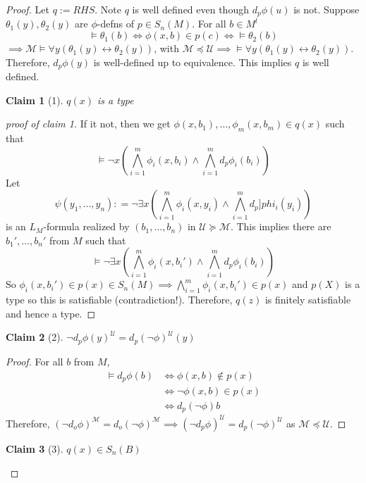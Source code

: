 \documentclass[letterpaper, 12pt]{article}
\newcommand{\cU}{\mathcal{U}}
\newcommand{\cM}{\mathcal{M}}
\theoremstyle{stdthm}
\theoremstyle{stddef}
\theoremstyle{stdnonum}
\newtheorem{claim}{Claim}
\theoremstyle{stdqands}
\theoremstyle{stdbold}
\begin{document}
\begin{proof}
Let $q:= RHS$. Note $q$ is well defined even though $d_p \phi(u)$ is not. Suppose $\theta_1(y), \theta_2(y)$ are $\phi$-defns of $p \in S_n(M)$. For all $b \in M^l$ 
\[ \models \theta_1(b) \iff \phi(x,b) \in p(c) \iff \models \theta_2(b) \] 
$\implies \cM \models \forall y(\theta_1 (y) \leftrightarrow \theta_2(y))$, with $\cM \preceq \cU \implies \models \forall y(\theta_1(y) \leftrightarrow \theta_2(y))$. Therefore, $d_p\phi(y)$ is well-defined up to equivalence. This implies $q$ is well defined. \\

\begin{claim}[1]
$q(x)$ is a type
\end{claim}

\begin{proof}[proof of claim 1]
If it not, then we get $\phi(x,b_1),\dots,\phi_m(x,b_m) \in q(x)$ such that 
\[ \models \neg x\left( \bigwedge_{i=1}^m \phi_i(x,b_i) \wedge \bigwedge_{i=1}^m d_p\phi_i(b_i)\right) \]
Let 
\[ \psi(y_1,\dots,y_n) : = \neg \exists x \left( \bigwedge_{i=1}^m \phi_i(x,y_i) \wedge \bigwedge_{i=1}^m d_p ]phi_i(y_i) \right) \]
is an $L_M$-formula realized by $(b_1,\dots,b_n)$ in $\cU \succeq \cM$.  This implies there are $b_1',\dots,b_n'$ from $M$ such that 
\[ \models \neg \exists x \left( \bigwedge_{i=1}^m \phi_i(x,b_i') \wedge \bigwedge_{i=1}^m d_p \phi_i(b_i)\right) \] 
So $\phi_i(x,b_i') \in p(x) \in S_n(M) \implies \bigwedge_{i=1}^m \phi_i(x,b_i') \in p(x)$ and $p(X)$ is a type so this is satisfiable (contradiction!). Therefore, $q(z)$ is finitely satisfiable and hence a type. 
\end{proof}

\begin{claim}[2]
$\neg d_p\phi(y)^\cU = d_p(\neg \phi)^\cU (y)$
\end{claim}

\begin{proof}
For all $b$ from $M$, 
\begin{align*}
\models d_p \phi(b) &\iff \phi(x,b) \notin p(x) \\
& \iff \neg \phi(x,b) \in p(x) \\
& \iff d_p (\neg \phi) b 
\end{align*}
Therefore, $(\neg d_o \phi)^\cM = d_o (\neg \phi)^\cM \implies (\neg d_p \phi)^\cU = d_p(\neg \phi)^\cU$ as $\cM \preceq \cU$. 
\end{proof}

\begin{claim}[3]
$q(x) \in S_n(B)$ 
\end{claim}


\end{proof}
\end{document}
